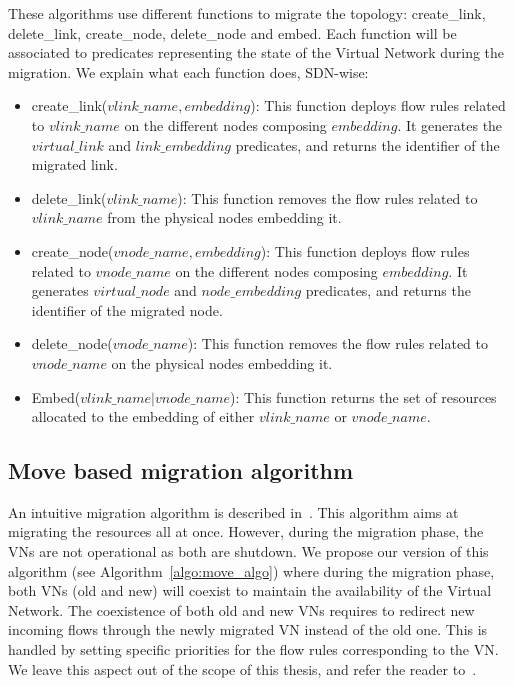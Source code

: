 These algorithms use different functions to migrate the topology: create\_link, delete\_link, create\_node, delete\_node and embed. 
Each function will be associated to predicates representing the state of the Virtual Network during the migration.
We explain what each function does, SDN-wise:

\begin{itemize}
\item create\_link($vlink\_name,embedding$): This function deploys flow rules related to $vlink\_name$ on the different nodes composing $embedding$. It generates the $virtual\_link$ and $link\_embedding$ predicates, and returns the identifier of the migrated link.
\item delete\_link($vlink\_name$): This function removes the flow rules related to $vlink\_name$ from the physical nodes embedding it.
\item create\_node($vnode\_name,embedding$): This function deploys flow rules related to $vnode\_name$ on the different nodes composing $embedding$. It generates $virtual\_node$ and $node\_embedding$ predicates, and returns the identifier of the migrated node.
\item delete\_node($vnode\_name$): This function removes the flow rules related to  $vnode\_name$ on the physical nodes embedding it.
\item Embed($vlink\_name \vert vnode\_name$): This function returns the set of resources allocated to the embedding of either $vlink\_name$ or $vnode\_name$. 
\end{itemize}



\subsection{Move based migration algorithm}
\label{sec:move-algo}

An intuitive migration algorithm is described in~\cite{Lime-Ghorbani2014}. 
This algorithm aims at migrating the resources all at once.
However, during the migration phase, the VNs are not operational as both are shutdown.
We propose our version of this algorithm (see Algorithm~\ref{algo:move_algo}) where during the migration phase, both VNs (old and new) will coexist to maintain the availability of the Virtual Network. The %
coexistence of both old and new VNs requires to redirect new incoming flows through the newly migrated VN instead of the old one.
This is handled by setting specific priorities for the flow rules corresponding to the VN.
We leave this aspect out of the scope of this thesis, and refer the reader to~\cite{Lime-Ghorbani2014}.

